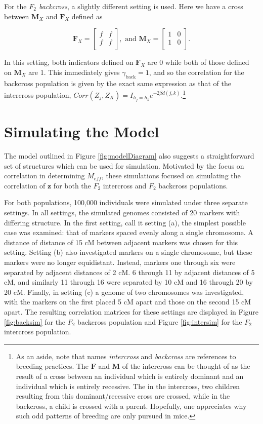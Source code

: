 \documentclass{article}
\newcommand{\ve}[1]{\mathbf{#1}}           %
\newcommand{\m}[1]{\mathbf{#1}}               %
\begin{document}
For the \textit{$F_2$ backcross}, a slightly different setting is used. Here we have a cross between $\m{M}_X$ and $\m{F}_X$ defined as

$$\m{F}_X = \begin{bmatrix}
  f & f \\
  f & f \\
\end{bmatrix}, \text{ and }
\m{M}_X = \begin{bmatrix}
  1 & 0 \\
  1 & 0 \\
\end{bmatrix}.$$

\noindent In this setting, both indicators defined on $\m{F}_X$ are 0 while both of those defined on $\m{M}_X$ are 1. This immediately gives $\gamma_{\text{back}} = 1$, and so the correlation for the backcross population is given by the exact same expression as that of the intercross population, $Corr(Z_j, Z_K) = I_{h_j = h_k} e^{-2 \beta d(j,k)}$.\footnote{As an aside, note that names \textit{intercross} and \textit{backcross} are references to breeding practices. The $\m{F}$ and $\m{M}$ of the intercross can be thought of as the result of a cross between an individual which is entirely dominant and an individual which is entirely recessive. The in the intercross, two children resulting from this dominant/recessive cross are crossed, while in the backcross, a child is crossed with a parent. Hopefully, one appreciates why such odd patterns of breeding are only pursued in mice.}

\section{Simulating the Model} \label{subsec:sim}

The model outlined in Figure \ref{fig:modelDiagram} also suggests a straightforward set of structures which can be used for simulation. Motivated by the focus on correlation in determining $M_{eff}$, these simulations focused on simulating the correlation of $\ve{z}$ for both the $F_2$ intercross and $F_2$ backcross populations.

For both populations, 100,000 individuals were simulated under three separate settings. In all settings, the simulated genomes consisted of 20 markers with differing structure. In the first setting, call it setting (a), the simplest possible case was examined: that of markers spaced evenly along a single chromosome. A distance of distance of 15 cM between adjacent markers was chosen for this setting. Setting (b) also investigated markers on a single chromosome, but these markers were no longer equidistant. Instead, markers one through six were separated by adjacent distances of 2 cM. 6 through 11 by adjacent distances of 5 cM, and similarly 11 through 16 were separated by 10 cM and 16 through 20 by 20 cM. Finally, in setting (c) a genome of two chromosomes was investigated, with the markers on the first placed 5 cM apart and those on the second 15 cM apart. The resulting correlation matrices for these settings are displayed in Figure \ref{fig:backsim} for the $F_2$ backcross population and Figure \ref{fig:intersim} for the $F_2$ intercross population.
\end{document}
